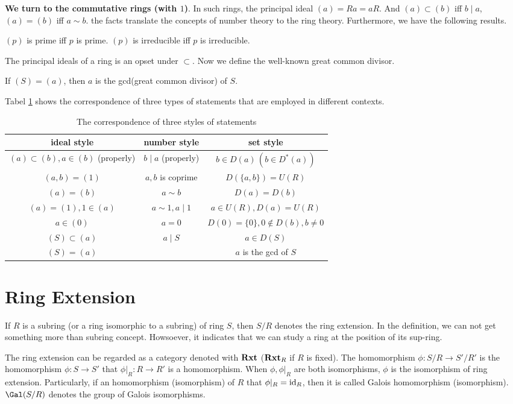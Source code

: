 \documentclass[11pt,a4paper,fleqn]{article}
\begin{document}
\textbf{We turn to the commutative rings (with $1$)}. In such rings, the principal ideal $(a)=Ra=aR$. And $(a)\subset(b)$ iff $b\mid a$, $(a)=(b)$ iff $a\sim b$. the facts translate the concepts of number theory to the ring theory. Furthermore, we have the following results.
\begin{theorem}
  $(p)$ is prime iff $p$ is prime.
  $(p)$ is irreducible iff $p$ is irreducible.
\end{theorem}

The principal ideals of a ring is an opset under $\subset$. Now we define the well-known great common divisor.
\begin{definition}
 If $(S)=(a)$, then $a$ is the gcd(great common divisor) of $S$.
\end{definition}

Tabel \ref{tb:cor} shows the correspondence of three types of statements that are employed in different contexts.
\begin{table}[h!]
\centering
\caption{The correspondence of three styles of statements}\label{tb:cor}
\begin{tabular}{c|c|c}
\hline
ideal style & number style & set style \\
\hline
$(a)\subset(b),a\in(b)$ (properly) & $b\mid a$ (properly) &$b\in D(a)\, (b\in D^*(a))$\\
$(a,b)=(1)$ & $a,b$ is coprime& $D(\{a,b\})=U(R)$\\
$(a)=(b)$  & $a\sim b$  &  $D(a)=D(b)$\\
$(a)=(1),1\in(a)$  & $a\sim 1,a\mid 1$ & $a\in U(R),D(a)=U(R)$\\
$a\in(0)$  & $a=0$ & $ D(0)=\{0\},0\not\in D(b),b\neq0$\\
$(S)\subset(a)$  & $a\mid S$ & $a\in D(S)$\\
$(S)=(a)$  &   & $a$ is the gcd of $S$\\
\hline
\end{tabular}
\end{table}


\section{Ring Extension}
If $R$ is a subring (or a ring isomorphic to a subring) of ring $S$, then $S/R$ denotes the ring extension. In the definition, we can not get something more than subring concept. Howsoever, it indicates that we can study a ring at the position of its sup-ring.

\begin{remark}
 The ring extension can be regarded as a category denoted with ${\textbf{Rxt}}$ (${\textbf{Rxt}}_R$ if $R$ is fixed). The homomorphism $\phi: S/R\to S'/R'$ is the homomorphism $\phi:S\to S'$ that $\phi |_R: R\to R'$ is a homomorphism. When $\phi,\phi|_R$ are both isomorphisms, $\phi$ is the isomorphism of ring extension. Particularly, if an homomorphism (isomorphism) of $R$ that $\phi|_R=\mathrm{id}_R$, then it is called Galois homomorphism (isomorphism). $\Gal(S/R)$ denotes the group of Galois isomorphisms.
\end{remark}
\end{document}
